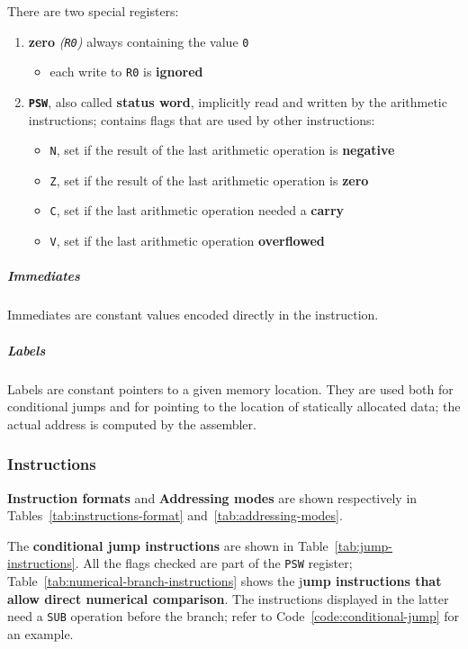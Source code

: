 \documentclass[english]{article}
\begin{document}
There are two special registers:
\begin{enumerate}[label=\textbf{\texttt{>}}]
  \item \textbf{zero} \textit{(\texttt{R0})} always containing the value \texttt{0}
        \begin{itemize}[label=\textbf{\texttt{>}}]
          \item each write to \texttt{R0} is \textbf{ignored}
        \end{itemize}
  \item \textbf{\texttt{PSW}}, also called \textbf{status word}, implicitly read and written by the arithmetic instructions; contains flags that are used by other instructions:
        \begin{itemize}[label=\textbf{\texttt{>}}]
          \item\texttt{N}, set if the result of the last arithmetic operation is \textbf{negative}
          \item\texttt{Z}, set if the result of the last arithmetic operation is \textbf{zero}
          \item\texttt{C}, set if the last arithmetic operation needed a \textbf{carry}
          \item\texttt{V}, set if the last arithmetic operation \textbf{overflowed}
        \end{itemize}
\end{enumerate}

\subparagraph*{Immediates}
Immediates are constant values encoded directly in the instruction.

\subparagraph*{Labels}
Labels are constant pointers to a given memory location.
They are used both for conditional jumps and for pointing to the location of statically allocated data;
the actual address is computed by the assembler.

\subsubsection{Instructions}

\textbf{Instruction formats} and \textbf{Addressing modes} are shown respectively in Tables~\ref{tab:instructions-format} and~\ref{tab:addressing-modes}.

The \textbf{conditional jump instructions} are shown in Table~\ref{tab:jump-instructions}. All the flags checked are part of the \texttt{PSW} register;
Table~\ref{tab:numerical-branch-instructions} shows the j\textbf{ump instructions that allow direct numerical comparison}.
The instructions displayed in the latter need a \texttt{SUB} operation before the branch; refer to Code~\ref{code:conditional-jump} for an example.
\end{document}

